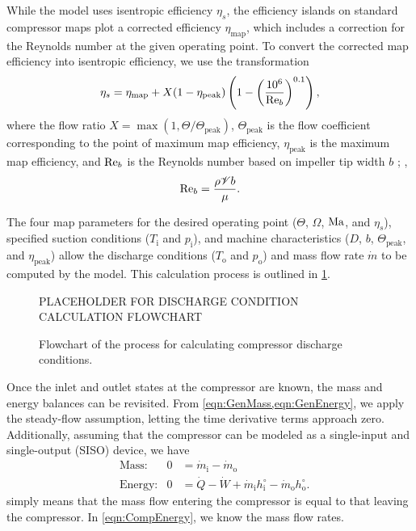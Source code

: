While the model uses isentropic efficiency $\eta_s$, 
the efficiency islands on standard compressor maps plot a corrected efficiency $\eta_{\text{map}}$,
which includes a correction for the Reynolds number at the given operating point.
To convert the corrected map efficiency into isentropic efficiency, 
we use the transformation
\begin{equation}
  \eta_s = \eta_{\text{map}} + X(1 - \eta_{\text{peak}})\left(1-\left(\frac{10^6}{\text{Re}_b}\right)^{0.1}\right),
\end{equation}
where the flow ratio $X = \max{(1,\Theta/\Theta_{\text{peak}})}$, 
$\Theta_{\text{peak}}$ is the flow coefficient 
corresponding to the point of maximum map efficiency,
$\eta_{\text{peak}}$ is the maximum map efficiency,
and $\text{Re}_b$ is the Reynolds number 
based on impeller tip width $b$%
; \eg{},
\begin{equation}
\text{Re}_b=\frac{\rho \mathscr{V} b}{\mu}.
\end{equation}

The four map parameters for the desired operating point 
($\Theta$, $\Omega$, $\text{Ma}$, and $\eta_s$), 
specified suction conditions ($T_{\text{i}}$ and $p_{\text{i}}$), 
and machine characteristics ($D$, $b$, $\Theta_{\text{peak}}$, and $\eta_{\text{peak}}$) 
allow the discharge conditions ($T_{\text{o}}$ and $p_{\text{o}}$) 
and mass flow rate $\dot{m}$ to be computed by the model. 
This calculation process is outlined in \cref{fig:DischargeCalc}.
\begin{figure}[htbp]
  \centering
  PLACEHOLDER FOR DISCHARGE CONDITION CALCULATION FLOWCHART
  \caption{Flowchart of the process for calculating compressor discharge conditions.}
  \label{fig:DischargeCalc}
\end{figure}

Once the inlet and outlet states at the compressor are known, 
the mass and energy balances can be revisited. 
From \cref{eqn:GenMass,eqn:GenEnergy}, we apply the steady-flow assumption, 
letting the time derivative terms approach zero. 
Additionally, assuming that the compressor can be modeled as a 
single-input and single-output (SISO) device, we have
\begin{align}
  &\text{Mass:}   & 0 &= {\dot{m}_{\text{i}}} - {\dot{m}_{\text{o}}} \label{eqn:CompMass}\\
  &\text{Energy:} & 0 &= \dot{Q} - \dot{W} + {\dot{m}_{\text{i}}h^{\circ}_{\text{i}}} - 
		{\dot{m}_{\text{o}}h^{\circ}_{\text{o}}} \label{eqn:CompEnergy}.
\end{align}
 simply means that the mass flow 
entering the compressor is equal to that leaving the compressor. 
In \cref{eqn:CompEnergy}, we know the mass flow rates. 

